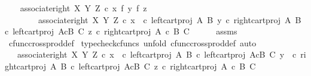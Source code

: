 \begin{isabellebody}
%
\isadelimproof
%
\endisadelimproof
%
\isatagproof
{}\isamarkupfalse%
{\isacharminus}{\kern0pt}\isanewline
\ \ \isamarkupfalse%
\ {\isachardoublequoteopen}associate{\isacharunderscore}{\kern0pt}right\ X\ Y\ Z\ {\isasymcirc}\isactrlsub c\ {\isacharparenleft}{\kern0pt}{\isacharparenleft}{\kern0pt}x\ {\isasymtimes}\isactrlsub f\ y{\isacharparenright}{\kern0pt}\ {\isasymtimes}\isactrlsub f\ z{\isacharparenright}{\kern0pt}\ {\isacharequal}{\kern0pt}\isanewline
\ \ \ \ \ \ \ \ associate{\isacharunderscore}{\kern0pt}right\ X\ Y\ Z\ {\isasymcirc}\isactrlsub c\ {\isasymlangle}{\isasymlangle}x\ \ {\isasymcirc}\isactrlsub c\ left{\isacharunderscore}{\kern0pt}cart{\isacharunderscore}{\kern0pt}proj\ A\ B{\isacharcomma}{\kern0pt}\ y\ {\isasymcirc}\isactrlsub c\ right{\isacharunderscore}{\kern0pt}cart{\isacharunderscore}{\kern0pt}proj\ A\ B{\isasymrangle}\ {\isasymcirc}\isactrlsub c\ left{\isacharunderscore}{\kern0pt}cart{\isacharunderscore}{\kern0pt}proj\ {\isacharparenleft}{\kern0pt}A{\isasymtimes}\isactrlsub cB{\isacharparenright}{\kern0pt}\ C{\isacharcomma}{\kern0pt}\ z\ {\isasymcirc}\isactrlsub c\ right{\isacharunderscore}{\kern0pt}cart{\isacharunderscore}{\kern0pt}proj\ {\isacharparenleft}{\kern0pt}A\ {\isasymtimes}\isactrlsub c\ B{\isacharparenright}{\kern0pt}\ C{\isasymrangle}{\isachardoublequoteclose}\isanewline
\ \ \ \ \isamarkupfalse%
\ assms\ \isamarkupfalse%
\ cfunc{\isacharunderscore}{\kern0pt}cross{\isacharunderscore}{\kern0pt}prod{\isacharunderscore}{\kern0pt}def{}\ \isamarkupfalse%
{\isacharparenleft}{\kern0pt}typecheck{\isacharunderscore}{\kern0pt}cfuncs{\isacharcomma}{\kern0pt}\ unfold\ cfunc{\isacharunderscore}{\kern0pt}cross{\isacharunderscore}{\kern0pt}prod{\isacharunderscore}{\kern0pt}def{}{\isacharcomma}{\kern0pt}\ auto{\isacharparenright}{\kern0pt}\ \isanewline
\ \ \isamarkupfalse%
\ \isamarkupfalse%
\ {\isachardoublequoteopen}{\isachardot}{\kern0pt}{\isachardot}{\kern0pt}{\isachardot}{\kern0pt}\ {\isacharequal}{\kern0pt}\ associate{\isacharunderscore}{\kern0pt}right\ X\ Y\ Z\ {\isasymcirc}\isactrlsub c\ {\isasymlangle}{\isasymlangle}x\ \ {\isasymcirc}\isactrlsub c\ left{\isacharunderscore}{\kern0pt}cart{\isacharunderscore}{\kern0pt}proj\ A\ B\ {\isasymcirc}\isactrlsub c\ left{\isacharunderscore}{\kern0pt}cart{\isacharunderscore}{\kern0pt}proj\ {\isacharparenleft}{\kern0pt}A{\isasymtimes}\isactrlsub cB{\isacharparenright}{\kern0pt}\ C{\isacharcomma}{\kern0pt}\ y\ \ {\isasymcirc}\isactrlsub c\ right{\isacharunderscore}{\kern0pt}cart{\isacharunderscore}{\kern0pt}proj\ A\ B\ {\isasymcirc}\isactrlsub c\ left{\isacharunderscore}{\kern0pt}cart{\isacharunderscore}{\kern0pt}proj\ {\isacharparenleft}{\kern0pt}A{\isasymtimes}\isactrlsub cB{\isacharparenright}{\kern0pt}\ C{\isasymrangle}{\isacharcomma}{\kern0pt}\ z\ {\isasymcirc}\isactrlsub c\ right{\isacharunderscore}{\kern0pt}cart{\isacharunderscore}{\kern0pt}proj\ {\isacharparenleft}{\kern0pt}A\ {\isasymtimes}\isactrlsub c\ B{\isacharparenright}{\kern0pt}\ C{\isasymrangle}{\isachardoublequoteclose}\isanewline

\end{isabellebody}
